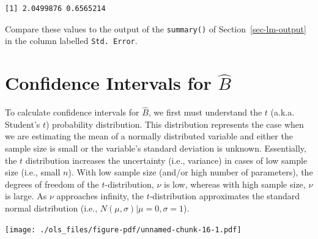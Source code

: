 \documentclass[
  letterpaper,
  DIV=11,
  numbers=noendperiod]{scrreprt}
\begin{document}
\begin{verbatim}
[1] 2.0499876 0.6565214
\end{verbatim}

Compare these values to the output of the \texttt{summary()} of
Section~\ref{sec-lm-output} in the column labelled \texttt{Std.\ Error}.

\hypertarget{sec-conf-beta}{%
\section{\texorpdfstring{Confidence Intervals for
\(\hat{B}\)}{Confidence Intervals for \textbackslash hat\{B\}}}\label{sec-conf-beta}}

To calculate confidence intervals for \(\hat{B}\), we first must
understand the \(t\) (a.k.a. Student's \(t\)) probability distribution.
This distribution represents the case when we are estimating the mean of
a normally distributed variable and either the sample size is small or
the variable's standard deviation is unknown. Essentially, the \(t\)
distribution increases the uncertainty (i.e., variance) in cases of low
sample size (i.e., small \(n\)). With low sample size (and/or high
number of parameters), the degrees of freedom of the \(t\)-distribution,
\(\nu\) is low, whereas with high sample size, \(\nu\) is large. As
\(\nu\) approaches infinity, the \(t\)-distribution approximates the
standard normal distribution (i.e., \(N(\mu, \sigma)|\mu=0,\sigma=1\)).

\texttt{[image: ./ols\_files/figure-pdf/unnamed-chunk-16-1.pdf]}
\end{document}
